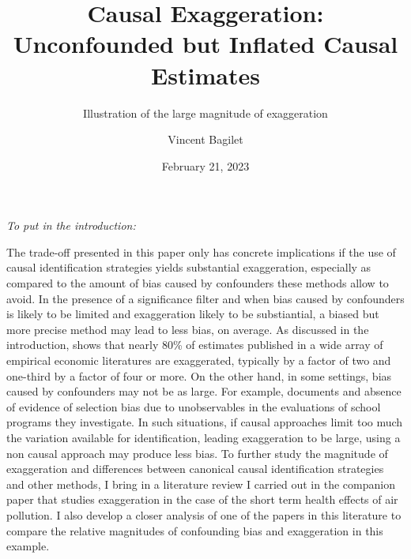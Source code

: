 \documentclass[usletter, 12pt]{article}
\begin{document}

	
	\title{Causal Exaggeration:\\ Unconfounded but Inflated Causal Estimates}
	
	\subtitle{Illustration of the large magnitude of exaggeration}

	\author{Vincent Bagilet}
	

	\date{February 21, 2023}
	
	
	\maketitle
	
	
			 	 		
		\textit{To put in the introduction:}
		
		The trade-off presented in this paper only has concrete implications if the use of causal identification strategies yields substantial exaggeration, especially as compared to the amount of bias caused by confounders these methods allow to avoid. In the presence of a significance filter and when bias caused by confounders is likely to be limited and exaggeration likely to be substiantial, a biased but more precise method may lead to less bias, on average. As discussed in the introduction, \cite{ioannidis_power_2017} shows that nearly 80\% of estimates published in a wide array of empirical economic literatures are exaggerated, typically by a factor of two and one-third by a factor of four or more. On the other hand, in some settings, bias caused by confounders may not be as large. For example, \cite{weidmann_lurking_2021} documents and absence of evidence of selection bias due to unobservables in the evaluations of school programs they investigate. In such situations, if causal approaches limit too much the variation available for identification, leading exaggeration to be large, using a non causal approach may produce less bias. To further study the magnitude of exaggeration and differences between canonical causal identification strategies and other methods, I bring in a literature review I carried out in the companion paper that studies exaggeration in the case of the short term health effects of air pollution. I also develop a closer analysis of one of the papers in this literature to compare the relative magnitudes of confounding bias and exaggeration in this example.\\
		
\end{document}
